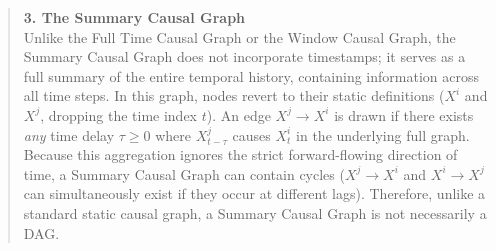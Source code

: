 \begin{quote}
\textbf{3. The Summary Causal Graph}\\
Unlike the Full Time Causal Graph or the Window Causal Graph, the Summary Causal Graph does not incorporate timestamps; it serves as a full summary of the entire temporal history, containing information across all time steps. In this graph, nodes revert to their static definitions ($X^i$ and $X^j$, dropping the time index $t$). 
An edge $X^j \rightarrow X^i$ is drawn if there exists \textit{any} time delay $\tau \geq 0$ where $X_{t-\tau}^j$ causes $X_t^i$ in the underlying full graph. Because this aggregation ignores the strict forward-flowing direction of time, a Summary Causal Graph can contain cycles ($X^j \rightarrow X^i$ and $X^i \rightarrow X^j$ can simultaneously exist if they occur at different lags). Therefore, unlike a standard static causal graph, a Summary Causal Graph is not necessarily a DAG.
\end{quote}

